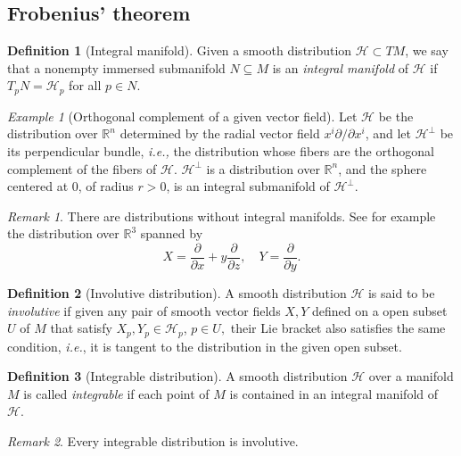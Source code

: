 \documentclass [xcolor=svgnames, t] {beamer}
\theoremstyle{definition}
\newtheorem{df}{Definition}
\theoremstyle{plain}
\theoremstyle{remark}
\newtheorem{ex}{Example}
\newtheorem{rem}{Remark}
\begin{document}
\subsection{Frobenius' theorem}
\begin{frame}[fragile]
	\begin{df}[Integral manifold]
	Given a smooth distribution $ \mathcal{H} \subset TM$, we say that a nonempty immersed submanifold $ N\subseteq M $  is an \textit{integral manifold} of $\mathcal{H}$ if $ T_p N = \mathcal{H}_p $ for all $ p\in N $.
\end{df}
\begin{ex}[Orthogonal complement of a given vector field]
Let $ \mathcal{H} $ be the distribution over $ \mathbb{R}^n $ determined by the radial vector field $ x^i \partial / \partial x^i $, and let $ \mathcal{H}^\perp $ be its perpendicular bundle, \textit{i.e.,} the distribution whose fibers are the orthogonal complement of the fibers of $ \mathcal{H}. $ $ \mathcal{H}^\perp $ is a distribution over $ \mathbb{R}^n  $, and the sphere centered at $0$, of radius $r>0$, is an integral submanifold of $ \mathcal{H}^\perp. $        
\end{ex}

\begin{rem}
There are distributions without integral manifolds. See for example the distribution over $ \mathbb{R}^3 $ 	spanned by $$ X= \frac{\partial }{\partial x} +y \frac{\partial }{\partial z}, \quad Y= \frac{\partial }{\partial y} . $$ 
\end{rem}
\end{frame}

\begin{frame}[fragile]
	\begin{df}[Involutive distribution]
A smooth distribution $ \mathcal{H} $ is said to be \textit{involutive} if given any pair of smooth vector fields $ X,Y $ defined on a open subset $ U $  of $ M $  that satisfy $X_p,Y_p\in \mathcal{H}_p $, $ p\in U, $ their Lie bracket also satisfies the same condition, \textit{i.e.}, it is tangent to the distribution in the given open subset. 
\end{df}
\begin{df}[Integrable distribution]
	A smooth distribution $ \mathcal{H} $ over a manifold $ M $ is called \textit{integrable} if each point of $ M $ is contained in an integral manifold of $ \mathcal{H}. $  
\end{df}
\begin{rem}
Every integrable distribution is involutive.	
\end{rem}
\end{frame}
\end{document}
